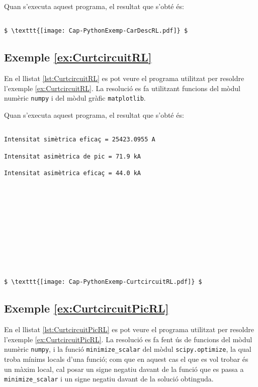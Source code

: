Quan s'executa aquest programa, el resultat que s'obté és:
\lstset{
	language=,
	numbers=none,
	frame=none
}
\begin{lstlisting}[mathescape=true]
	
$ \texttt{[image: Cap-PythonExemp-CarDescRL.pdf]} $
\end{lstlisting}


\hypertarget{exemple:CurtcircuitRL}{\subsection{Exemple \ref*{ex:CurtcircuitRL} \CurtcircuitRL}}
En el llistat \vref{lst:CurtcircuitRL} es pot veure el programa utilitzat per resoldre l'exemple \vref{ex:CurtcircuitRL}. La resolució es fa utilitzant funcions del mòdul numèric \texttt{numpy} i del mòdul gràfic  \texttt{matplotlib}.


Quan s'executa aquest programa, el resultat que s'obté és:
\lstset{
	language=,
	numbers=none,
	frame=none
}

\begin{lstlisting}[mathescape=true]
	
Intensitat simètrica eficaç = 25423.0955 A

Intensitat asimètrica de pic = 71.9 kA

Intensitat asimètrica eficaç = 44.0 kA












$ \texttt{[image: Cap-PythonExemp-CurtcircuitRL.pdf]} $
\end{lstlisting}


\hypertarget{exemple:CurtcircuitPicRL}{\subsection{Exemple \ref*{ex:CurtcircuitPicRL} \CurtcircuitPicRL}}
En el llistat \vref{lst:CurtcircuitPicRL} es pot veure el programa utilitzat per resoldre l'exemple \vref{ex:CurtcircuitPicRL}. La resolució es fa fent ús de funcions del mòdul numèric \texttt{numpy}, i la funció \texttt{minimize\_scalar} del mòdul  \texttt{scipy.optimize}, la qual troba mínims locals d'una funció; com que en aquest cas  el que es vol trobar és un màxim local, cal posar un signe negatiu davant de la funció que es passa a \texttt{minimize\_scalar} i un signe negatiu davant de la solució obtinguda.


